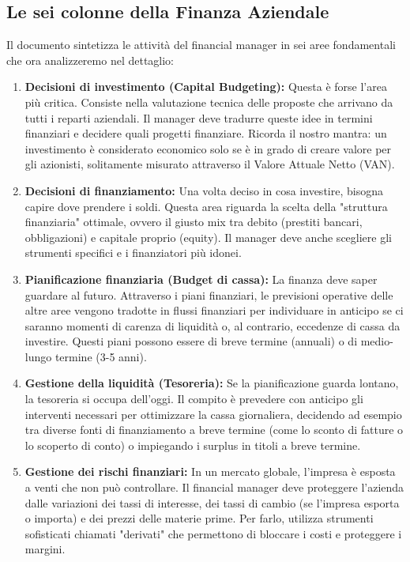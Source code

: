 \documentclass[a4paper,10pt]{article}
\begin{document}
\subsection*{Le sei colonne della Finanza Aziendale}

Il documento sintetizza le attività del financial manager in sei aree fondamentali che ora analizzeremo nel dettaglio:

\begin{enumerate}
    \item \textbf{Decisioni di investimento (Capital Budgeting):} Questa è forse l'area più critica. Consiste nella valutazione tecnica delle proposte che arrivano da tutti i reparti aziendali. Il manager deve tradurre queste idee in termini finanziari e decidere quali progetti finanziare. Ricorda il nostro mantra: un investimento è considerato economico solo se è in grado di creare valore per gli azionisti, solitamente misurato attraverso il Valore Attuale Netto (VAN).
    
    \item \textbf{Decisioni di finanziamento:} Una volta deciso in cosa investire, bisogna capire dove prendere i soldi. Questa area riguarda la scelta della "struttura finanziaria" ottimale, ovvero il giusto mix tra debito (prestiti bancari, obbligazioni) e capitale proprio (equity). Il manager deve anche scegliere gli strumenti specifici e i finanziatori più idonei.
    
    \item \textbf{Pianificazione finanziaria (Budget di cassa):} La finanza deve saper guardare al futuro. Attraverso i piani finanziari, le previsioni operative delle altre aree vengono tradotte in flussi finanziari per individuare in anticipo se ci saranno momenti di carenza di liquidità o, al contrario, eccedenze di cassa da investire. Questi piani possono essere di breve termine (annuali) o di medio-lungo termine (3-5 anni).
    
    \item \textbf{Gestione della liquidità (Tesoreria):} Se la pianificazione guarda lontano, la tesoreria si occupa dell'oggi. Il compito è prevedere con anticipo gli interventi necessari per ottimizzare la cassa giornaliera, decidendo ad esempio tra diverse fonti di finanziamento a breve termine (come lo sconto di fatture o lo scoperto di conto) o impiegando i surplus in titoli a breve termine.
    
    \item \textbf{Gestione dei rischi finanziari:} In un mercato globale, l'impresa è esposta a venti che non può controllare. Il financial manager deve proteggere l'azienda dalle variazioni dei tassi di interesse, dei tassi di cambio (se l'impresa esporta o importa) e dei prezzi delle materie prime. Per farlo, utilizza strumenti sofisticati chiamati "derivati" che permettono di bloccare i costi e proteggere i margini.
    

\end{enumerate}
\end{document}
